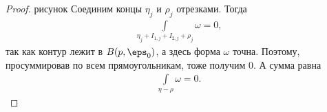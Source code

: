 \begin{proof}
 {\color{red} рисунок} Соединим концы $\eta_j$ и $\rho_j$ отрезками. Тогда
 \begin{align*}
  \int\limits_{\eta_j + I_{1,j} + I_{2,j} + \rho_j} \omega = 0
 ,\end{align*} так как  контур лежит в $B(p,\eps_0)$, а здесь форма $\omega$ точна. Поэтому, просуммировав по всем прямоугольникам, тоже получим $0$. А сумма равна
 \begin{align*}
  \int\limits_{\eta - \rho}  \omega = 0
 .\end{align*} 
\end{proof}

